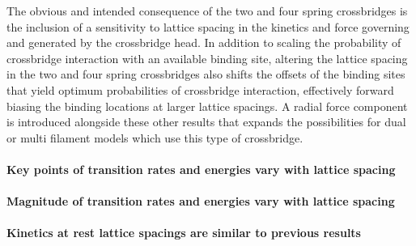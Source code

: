 \documentclass[]{article}
\begin{document}

The obvious and intended consequence of the two and four spring crossbridges is the inclusion of a sensitivity to lattice spacing in the kinetics and force governing and generated by the crossbridge head. 
In addition to scaling the probability of crossbridge interaction with an available binding site, altering the lattice spacing in the two and four spring crossbridges also shifts the offsets of the binding sites that yield optimum probabilities of crossbridge interaction, effectively forward biasing the binding locations at larger lattice spacings.
A radial force component is introduced alongside these other results that expands the possibilities for dual or multi filament models which use this type of crossbridge.

\paragraph{Key points of transition rates and energies vary with lattice spacing} %


\paragraph{Magnitude of transition rates and energies vary with lattice spacing} %


\paragraph{Kinetics at rest lattice spacings are similar to previous results} %
\end{document}
